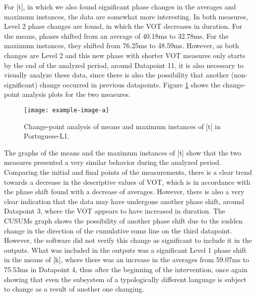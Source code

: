 For [t], in which we also found significant phase changes in the averages and
maximum instances, the data are somewhat more interesting. In both measures,
Level 2 phase changes are found, in which the VOT decreases in duration. For
the means, phases shifted from an average of 40.18ms to 32.78ms. For the
maximum instances, they shifted from 76.25ms to 48.59ms. However, as both
changes are Level 2 and this new phase with shorter VOT measures only starts by
the end of the analyzed period, around Datapoint 11, it is also necessary to
visually analyze these data, since there is also the possibility that another
(non-significant) change occurred in previous datapoints. Figure
\ref{laura-fig04} shows the change-point analysis plots for the two measures.

\begin{figure}[h]
\centering
\texttt{[image: example-image-a]}
\caption{Change-point analysis of means and maximum instances of [t] in Portuguese-L1.}
\label{laura-fig04}
\end{figure}

The graphs of the means and the maximum instances of [t] show that the two
measures presented a very similar behavior during the analyzed period.
Comparing the initial and final points of the measurements, there is a clear
trend towards a decrease in the descriptive values of VOT, which is in
accordance with the phase shift found with a decrease of averages. However,
there is also a very clear indication that the data may have undergone another
phase shift, around Datapoint 3, where the VOT appears to have increased in
duration. The CUSUMs graph shows the possibility of another phase shift due to
the sudden change in the direction of the cumulative sums line on the third
datapoint. However, the software did not verify this change as significant to
include it in the outputs. What was included in the outputs was a significant
Level 1 phase shift in the means of [k], where there was an increase in the
averages from 59.07ms to 75.53ms in Datapoint 4, thus after the beginning of
the intervention, once again showing that even the subsystem of a typologically
different language is subject to change as a result of another one changing.


